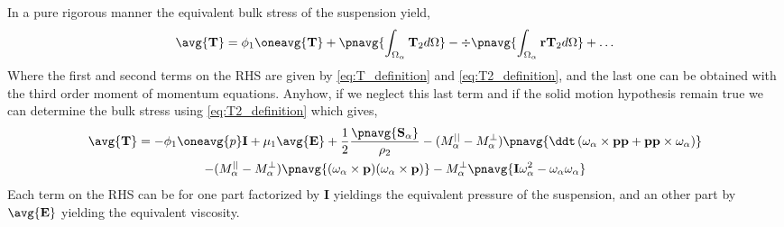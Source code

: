 In a pure rigorous manner the equivalent bulk stress of the suspension yield, 
\begin{equation*}
    \avg{\textbf{T}} = 
    \phi_1 \oneavg{\textbf{T}} 
    + \pnavg{\int_{\Omega_\alpha} \mathbf{T}_2 d\Omega}
    -\div \pnavg{\int_{\Omega_\alpha} \textbf{r}\mathbf{T}_2 d\Omega}
    + \ldots
\end{equation*}
Where the first and second terms on the RHS are given by \ref{eq:T_definition} and \ref{eq:T2_definition}, and the last one can be obtained with the third order moment of momentum equations. 
Anyhow, if we neglect this last term and if the solid motion hypothesis remain true we can determine the bulk stress using \ref{eq:T2_definition} which gives,
\begin{multline*}
    \avg{\textbf{T}} = 
    - \phi_1\oneavg{p}\textbf{I} 
    + \mu_1 \avg{\textbf{E}} 
    + \frac{1}{2}\frac{\pnavg{\textbf{S}_\alpha}}{\rho_2}
    - (M_\alpha^{||} - M_\alpha^\bot) \pnavg{\ddt \left(
        \omega_\alpha \times
        \textbf{pp}
        + \textbf{pp} \times \omega_\alpha
    \right)}\\
    - (M_\alpha^{||} - M_\alpha^\bot) \pnavg{
        (\omega_\alpha \times \textbf{p}) (\omega_\alpha \times \textbf{p}) } 
    -M_\alpha^\bot \pnavg{\textbf{I} \omega_\alpha^2 -\omega_\alpha\omega_\alpha }
\end{multline*}
Each term on the RHS can be for one part factorized by \textbf{I} yieldings the equivalent pressure of the suspension, and an other part by $\avg{\textbf{E}}$ yielding the equivalent viscosity. 




